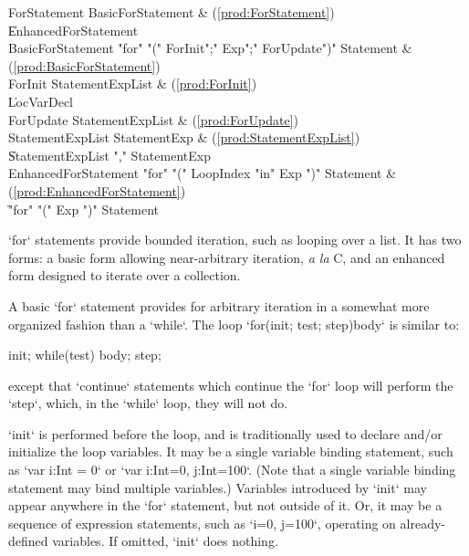 \begin{bbgrammar}
        ForStatement \: BasicForStatement & (\ref{prod:ForStatement}) \\
                     \| EnhancedForStatement \\
   BasicForStatement \: \xcd"for" \xcd"(" ForInit\opt \xcd";" Exp\opt \xcd";" ForUpdate\opt \xcd")" Statement & (\ref{prod:BasicForStatement}) \\
             ForInit \: StatementExpList & (\ref{prod:ForInit}) \\
                     \| LocVarDecl \\
           ForUpdate \: StatementExpList & (\ref{prod:ForUpdate}) \\
    StatementExpList \: StatementExp & (\ref{prod:StatementExpList}) \\
                     \| StatementExpList \xcd"," StatementExp \\
EnhancedForStatement \: \xcd"for" \xcd"(" LoopIndex \xcd"in" Exp \xcd")" Statement & (\ref{prod:EnhancedForStatement}) \\
                     \| \xcd"for" \xcd"(" Exp \xcd")" Statement \\
\end{bbgrammar}

\xcd`for` statements provide bounded iteration, such as looping over a list.
It has two forms: a basic form allowing near-arbitrary iteration, {\em a la}
C, and an enhanced form designed to iterate over a collection.

A basic \xcd`for` statement provides for arbitrary iteration in a somewhat
more organized fashion than a \xcd`while`.  The loop 
\xcd`for(init; test; step)body` is
similar to: 
\begin{xten}
{
   init;
   while(test) {
      body;
      step;
   }
}
\end{xten}
\noindent
except that \xcd`continue` statements which continue the \xcd`for` loop will
perform the \xcd`step`, which, in the \xcd`while` loop, they will not do. 

\xcd`init` is performed before the loop, and is traditionally used to declare
and/or initialize the loop variables. It may be a single variable binding
statement, such as \xcd`var i:Int = 0` or \xcd`var i:Int=0, j:Int=100`. (Note
that a single variable binding statement may bind multiple variables.)
Variables introduced by \xcd`init` may appear anywhere in the \xcd`for`
statement, but not outside of it.  Or, it may be a sequence of expression
statements, such as \xcd`i=0, j=100`, operating on already-defined variables.
If omitted, \xcd`init` does nothing.


